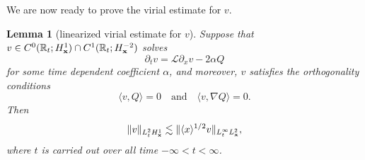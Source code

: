 \documentclass[12pt,letterpaper]{amsart}
\newcommand{\la}{\langle}
\newcommand{\ra}{\rangle}
\newtheorem{lemma}[theorem]{Lemma}
\theoremstyle{remark}
\numberwithin{equation}{section}
\numberwithin{theorem}{section}
\numberwithin{table}{section}
\begin{document}


We are now ready to prove the virial estimate for $v$.

\begin{lemma}[linearized virial  estimate for $v$]
\label{L:v-virial}
Suppose that $v \in C^0(\mathbb{R}_t; H_{\bf{x}}^1) \cap C^1(\mathbb{R}_t; H_{\bf{x}}^{-2})$  solves
$$
\partial_t v =  \mathcal{L}\partial_x v  -2 \alpha Q
$$
for some time dependent coefficient $\alpha$, and moreover, $v$ satisfies the orthogonality conditions 
$$
\la v, Q \ra =0\quad \mbox{and} \quad \la v, \nabla Q \ra =0. 
$$
Then 
\begin{equation}
\label{E:v-virial-1}
\| v\|_{L_t^2H_{\bf x}^1} \lesssim \| \la x \ra^{1/2} v \|_{L_t^\infty L_{\bf x}^2},
\end{equation}
where $t$ is carried out over all time $-\infty < t< \infty$.
\end{lemma}
\end{document}

